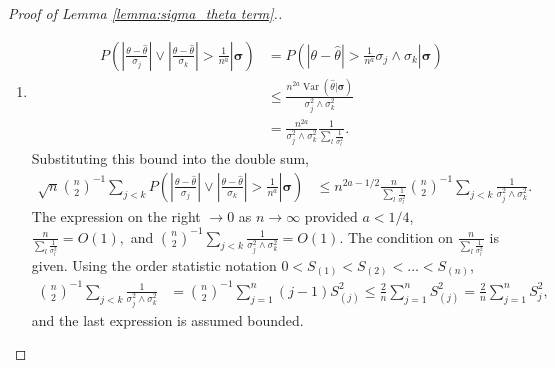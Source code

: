 \documentclass[12pt]{article}
\renewcommand{\P}{P}
\newcommand{\s}{S}
\DeclareMathOperator{\V}{Var}
\begin{document}
\begin{proof}[Proof of Lemma \ref{lemma:sigma_theta term}.]
\begin{enumerate}[wide, labelwidth=!, labelindent=0pt]
      \item \label{lemma:1:step:2}
      \begin{align}
        \P\left(\left.
        \left|\frac{\theta-\hat\theta}{\sigma_j}\right|\vee\left|\frac{\theta-\hat\theta}{\sigma_k}\right|>\frac{1}{n^a}
        \right|\pmb{\sigma}\right) &= \P\left(\left.|\theta-\hat\theta|>\frac{1}{n^a}\sigma_j\wedge\sigma_k \right|\pmb{\sigma}\right)\\
                                   &\le \frac{n^{2a}\V(\hat\theta | \pmb{\sigma})}{\sigma_j^2\wedge\sigma_k^2}\\
                                   &=\frac{n^{2a}}{\sigma_j^2\wedge\sigma_k^2}\frac{1}{\sum_l\frac{1}{\sigma_l^2}}.                                     
      \end{align}
      Substituting this bound into the double sum,
      \begin{align}
        \sqrt{n}{n\choose 2}^{-1}\sum_{j<k}
                \P\left(\left.
        \left|\frac{\theta-\hat\theta}{\sigma_j}\right|\vee\left|\frac{\theta-\hat\theta}{\sigma_k}\right|>\frac{1}{n^a}
        \right|\pmb{\sigma}\right) &\le n^{2a-1/2}\frac{n}{\sum_l\frac{1}{\sigma_l^2}}{n\choose 2}^{-1}\sum_{j<k}\frac{1}{\sigma_j^2\wedge\sigma_k^2}.
      \end{align}
    The expression on the right $\to 0$ as $n\to\infty$ provided $a<1/4$, $\frac{n}{\sum_l\frac{1}{\sigma_l^2}}=O(1),$ and ${n\choose 2}^{-1}\sum_{j<k}\frac{1}{\sigma_j^2\wedge\sigma_k^2}=O(1).$ The condition on $\frac{n}{\sum_l\frac{1}{\sigma_l^2}}$ is given. Using the order statistic notation $0<\s_{(1)}<\s_{(2)}<\ldots<\s_{(n)}$,
    \begin{align}
      {n\choose 2}^{-1}\sum_{j<k}\frac{1}{\sigma_j^2\wedge\sigma_k^2} &= {n\choose 2}^{-1}\sum_{j=1}^n(j-1)\s_{(j)}^2 \le\frac{2}{n}\sum_{j=1}^n\s_{(j)}^2 = \frac{2}{n}\sum_{j=1}^n\s_j^2,
    \end{align}
    and the last expression is assumed bounded.



\end{enumerate}
\end{proof}
\end{document}
